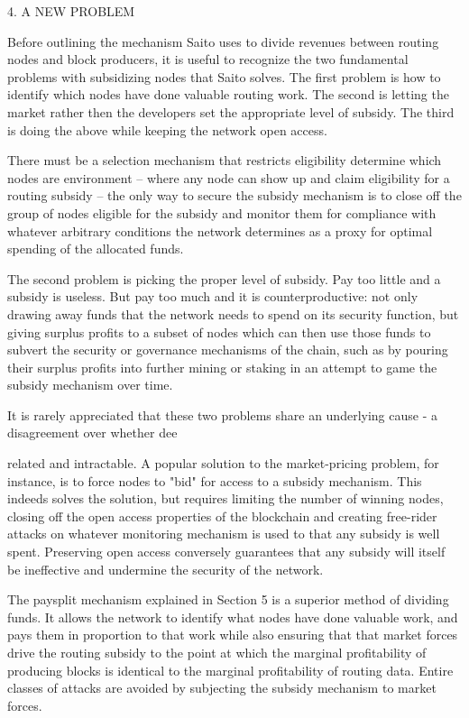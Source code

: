 \documentclass[11.5pt, oneside]{article}   	%
\begin{document}
\begin{multicols}{2}
4. A NEW PROBLEM

Before outlining the mechanism Saito uses to divide revenues between routing nodes and block producers, it is useful to recognize the two fundamental problems with subsidizing nodes that Saito solves. The first problem is how to identify which nodes have done valuable routing work. The second is letting the market rather then the developers set the appropriate level of subsidy. The third is doing the above while keeping the network open access.

There must be a selection mechanism that restricts eligibility  determine which nodes are  environment -- where any node can show up and claim eligibility for a routing subsidy -- the only way to secure the subsidy mechanism is to close off the group of nodes eligible for the subsidy and monitor them for compliance with whatever arbitrary conditions the network determines as a proxy for optimal spending of the allocated funds.

The second problem is picking the proper level of subsidy. Pay too little and a subsidy is useless. But pay too much and it is counterproductive: not only drawing away funds that the network needs to spend on its security function, but giving surplus profits to a subset of nodes which can then use those funds to subvert the security or governance mechanisms of the chain, such as by pouring their surplus profits into further mining or staking in an attempt to game the subsidy mechanism over time.

It is rarely appreciated that these two problems share an underlying cause - a disagreement over whether dee


 related and intractable. A popular solution to the market-pricing problem, for instance, is to force nodes to "bid" for access to a subsidy mechanism. This indeeds solves the solution, but requires limiting the number of winning nodes, closing off the open access properties of the blockchain and creating free-rider attacks on whatever monitoring mechanism is used to that any subsidy is well spent. Preserving open access conversely guarantees that any subsidy will itself be ineffective and undermine the security of the network.

The paysplit mechanism explained in Section 5 is a superior method of dividing funds. It allows the network to identify what nodes have done valuable work, and pays them in proportion to that work while also ensuring that that market forces drive the routing subsidy to the point at which the marginal profitability of producing blocks is identical to the marginal profitability of routing data. Entire classes of attacks are avoided by subjecting the subsidy mechanism to market forces.





\end{multicols}
\end{document}
